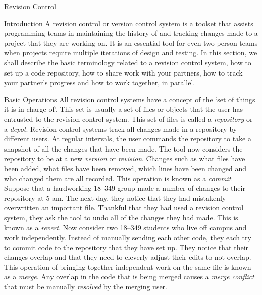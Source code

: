 \documentclass{article}
\begin{document}
	\begin{section}{Revision Control}
	\begin{subsection}{Introduction} A revision control or version
	control system is a toolset that assists programming teams in
	maintaining the history of and tracking changes made to a
	project that they are working on.  It is an essential tool for
	even two person teams when projects require multiple
	iterations of design and testing.  In this section, we shall
	describe the basic terminology related to a revision control
	system, how to set up a code repository, how to share work
	with your partners, how to track your partner's progress and
	how to work together, in parallel.  \end{subsection}

	\begin{subsection}{Basic Operations} All revision control
	systems have a concept of the `set of things it is in charge
	of'.  This set is usually a set of files or objects that the
	user has entrusted to the revision control system.  This set
	of files is called a \emph{repository} or a \emph{depot}.
	Revision control systems track all changes made in a
	repository by different users.  At regular intervals, the user
	commands the repository to take a snapshot of all the changes
	that have been made.  The tool now considers the repository to
	be at a new \emph{version} or \emph{revision}.  Changes such
	as what files have been added, what files have been removed,
	which lines have been changed and who changed them are all
	recorded.  This operation is known as a \emph{commit}.
	Suppose that a hardworking 18--349 group made a number of
	changes to their repository at 5 am.  The next day, they
	notice that they had mistakenly overwritten an important file.
	Thankful that they had used a revision control system, they
	ask the tool to undo all of the changes they had made.  This
	is known as a \emph{revert}.  Now consider two 18--349
	students who live off campus and work independently.  Instead
	of manually sending each other code, they each try to commit
	code to the repository that they have set up.  They notice
	that their changes overlap and that they need to cleverly
	adjust their edits to not overlap.  This operation of bringing
	together independent work on the same file is known as a
	\emph{merge}.  Any overlap in the code that is being merged
	causes a \emph{merge conflict} that must be manually
	\emph{resolved} by the merging user.  \end{subsection}


\end{section}
\end{document}
